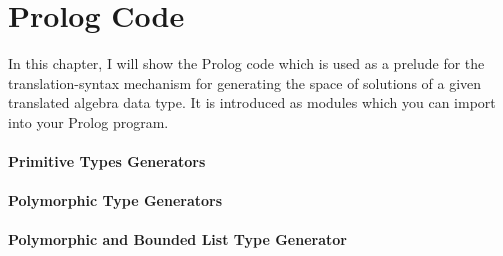 \chapter{Prolog Code}
In this chapter, I will show the Prolog code which is used as a prelude for the translation-syntax mechanism for generating the space of solutions of a given translated algebra data type. It is introduced as modules which you can import into your Prolog program.
\subsubsection*{Primitive Types Generators}

\subsubsection*{Polymorphic Type Generators}

\subsubsection*{Polymorphic and Bounded List Type Generator}

